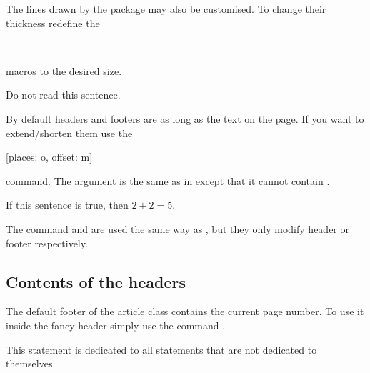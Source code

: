 The lines drawn by the  package may also be customised. To change
their thickness redefine the
\begin{lscommand}
   \\
\end{lscommand}
macros to the desired size.
\begin{example}[standalone, paperheight=3cm, paperwidth=3cm]
\geometry{includefoot, includehead, headsep=.5em, footskip=1em} %
\sloppy %
\usepackage{fancyhdr} %
\pagestyle{fancy} %
\RenewDocumentCommand{\headrulewidth}{}{.2cm}
\RenewDocumentCommand{\footrulewidth}{}{.5cm}

\noindent %
Do not read this sentence.
\end{example}

By default headers and footers are as long as the text on the page. If you want
to extend\slash{}shorten them use the
\begin{lscommand}
  [places: o, offset: m]
\end{lscommand}
command. The  argument is the same as in  except that
it cannot contain .
\begin{example}[standalone, paperheight=3cm]
\geometry{includehead, includefoot, headsep=.5em, footskip=1em} %
\sloppy %
\usepackage{fancyhdr}%
\pagestyle{fancy}%
\fancyhfoffset[L]{-1cm}
\fancyhfoffset[R]{.2cm}

\noindent %
If this sentence is true,
then \(2 + 2 = 5\).
\end{example}
The command  and  are
used the same way as , but they only modify header or footer respectively.

\subsection{Contents of the headers}

The default footer of the article class contains the current page number. To
use it inside the fancy header simply use the command .
\begin{example}[standalone, paperheight=2.5cm, to_page=2, vertical_pages]
\geometry{includehead, includefoot, headsep=.5em, footskip=1em} %
\sloppy %
\usepackage{fancyhdr}%
\pagestyle{fancy}%

\noindent %
This statement is dedicated to
all statements that are not
dedicated to themselves. 
\end{example}

